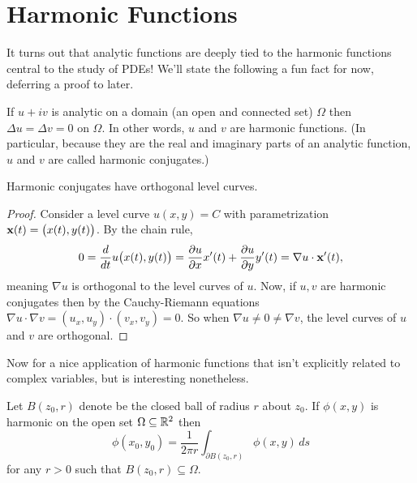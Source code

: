 \documentclass[../m136main.tex]{subfiles}
\begin{document}
\section{Harmonic Functions}
It turns out that analytic functions are deeply tied to the harmonic functions central to the study of PDEs!
We'll state the following a fun fact for now, deferring a proof to later.

\begin{theorem}
    If $u + iv$ is analytic on a domain (an open and connected set) $\Omega$ then $\Delta u = \Delta v = 0$ on $\Omega$.
    In other words, $u$ and $v$ are harmonic functions.
    (In particular, because they are the real and imaginary parts of an analytic function, $u$ and $v$ are called harmonic conjugates.)
\end{theorem}

\begin{theorem}[]
    Harmonic conjugates have orthogonal level curves.
\end{theorem}

\begin{proof}
    Consider a level curve $u(x,y) = C$ with parametrization $\mathbf{x}(t) = \big( x(t), y(t) \big)$.
    By the chain rule,
    \[ 0 = \frac{d}{dt} u \big( x(t), y(t) \big) = \frac{\partial u}{\partial x} x'(t) + \frac{\partial u}{\partial y} y'(t) = \nabla u \cdot \mathbf{x}'(t), \]
    meaning $\nabla u$ is orthogonal to the level curves of $u$.
    Now, if $u,v$ are harmonic conjugates then by the Cauchy-Riemann equations $\nabla u \cdot \nabla v = (u_x, u_y) \cdot (v_x, v_y) = 0$.
    So when $\nabla u \neq 0 \neq \nabla v$, the level curves of $u$ and $v$ are orthogonal.
\end{proof}

Now for a nice application of harmonic functions that isn't explicitly related to complex variables, but is interesting nonetheless.

\pagebreak

\begin{theorem}
    Let $B(z_0, r)$ denote be the closed ball of radius $r$ about $z_0$.
    If $\phi(x,y)$ is harmonic on the open set $\Omega \subseteq \mathbb{R}^2$ then
    \[ \phi(x_0, y_0) = \frac{1}{2\pi r} \int_{\partial B(z_0, r)} \phi(x,y) \,ds \]
    for any $r > 0$ such that $B(z_0, r) \subseteq \Omega$.
\end{theorem}
\end{document}
